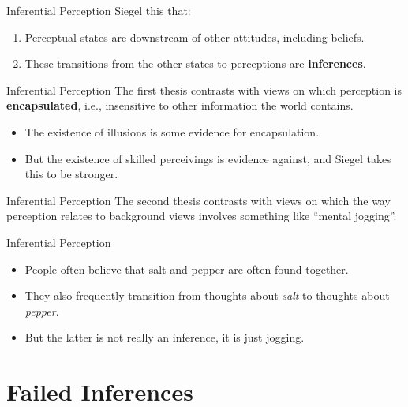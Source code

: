\documentclass[
  17pt,
  letterpaper,
  ignorenonframetext,
  aspectratio=169,
  xcolor={dvipsnames}]{beamer}
\providecommand{\tightlist}{%
  \setlength{\itemsep}{0pt}\setlength{\parskip}{0pt}}\usepackage{longtable,booktabs,array}
\begin{document}
\begin{frame}{Inferential Perception}
\protect\hypertarget{inferential-perception}{}
Siegel this that:

\begin{enumerate}[<+->]
\tightlist
\item
  Perceptual states are downstream of other attitudes, including
  beliefs.
\item
  These transitions from the other states to perceptions are
  \textbf{inferences}.
\end{enumerate}
\end{frame}

\begin{frame}{Inferential Perception}
\protect\hypertarget{inferential-perception-1}{}
The first thesis contrasts with views on which perception is
\textbf{encapsulated}, i.e., insensitive to other information the world
contains.

\begin{itemize}[<+->]
\tightlist
\item
  The existence of illusions is some evidence for encapsulation.
\item
  But the existence of skilled perceivings is evidence against, and
  Siegel takes this to be stronger.
\end{itemize}
\end{frame}

\begin{frame}{Inferential Perception}
\protect\hypertarget{inferential-perception-2}{}
The second thesis contrasts with views on which the way perception
relates to background views involves something like ``mental jogging''.
\end{frame}

\begin{frame}{Inferential Perception}
\protect\hypertarget{inferential-perception-3}{}
\begin{itemize}[<+->]
\tightlist
\item
  People often believe that salt and pepper are often found together.
\item
  They also frequently transition from thoughts about \emph{salt} to
  thoughts about \emph{pepper}.
\item
  But the latter is not really an inference, it is just jogging.
\end{itemize}
\end{frame}

\hypertarget{failed-inferences}{%
\section{Failed Inferences}\label{failed-inferences}}
\end{document}
